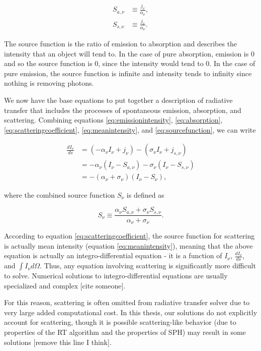 \begin{align}
\label{eq:sourcefunction}
S_{a,\nu} &\equiv \frac{j_{\nu}}{\alpha_{\nu}},\\
S_{s,\nu} &\equiv \frac{j_{\nu}}{\alpha_{\nu}}.
\end{align}

The source function is the ratio of emission to absorption and describes the intensity that an object will tend to. In the case of pure absorption, emission is 0 and so the source function is 0, since the intensity would tend to 0. In the case of pure emission, the source function is infinite and intensity tends to infinity since nothing is removing photons.

We now have the base equations to put together a description of radiative transfer that includes the processes of spontaneous emission, absorption, and scattering. Combining equations \ref{eq:emissionintensity}, \ref{eq:absorption}, \ref{eq:scatteringcoefficient}, \ref{eq:meanintensity}, and \ref{eq:sourcefunction}, we can write

\begin{align}
\label{eq:combinedtransfer}
\frac{dI_{\nu}}{ds} &= (-\alpha_{\nu}I_{\nu} + j_{\nu}) - (\sigma_{\nu}I_{\nu} + j_{s,\nu}) \nonumber\\
 &= -\alpha_{\nu}(I_{\nu} - S_{a,\nu}) - \sigma_{\nu}(I_{\nu} - S_{s,\nu}) \nonumber\\
 &= -(\alpha_{\nu} + \sigma_{\nu})(I_{\nu}-S_{\nu}),
\end{align}

where the combined source function $S_{\nu}$ is defined as

\begin{equation}
\label{eq:combinedsourcefunction}
S_{\nu} \equiv \frac{\alpha_{\nu}S_{a,\nu} + \sigma_{\nu}S_{s,\nu}}{\alpha_{\nu} + \sigma_{\nu}}.
\end{equation}

According to equation \ref{eq:scatteringcoefficient}, the source function for scattering is actually mean intensity (equation \ref{eq:meanintensity}), meaning that the above equation is actually an integro-differential equation - it is a function of $I_{\nu}$, $\frac{dI_{\nu}}{ds}$, and $\int I_{\nu} d\Omega$. Thus, any equation involving scattering is significantly more difficult to solve. Numerical solutions to integro-differential equations are usually specialized and complex [cite someone].

For this reason, scattering is often omitted from radiative transfer solver due to very large added computational cost. In this thesis, our solutions do not explicitly account for scattering, though it is possible scattering-like behavior (due to properties of the RT algorithm and the properties of SPH) may result in some solutions [remove this line I think].

